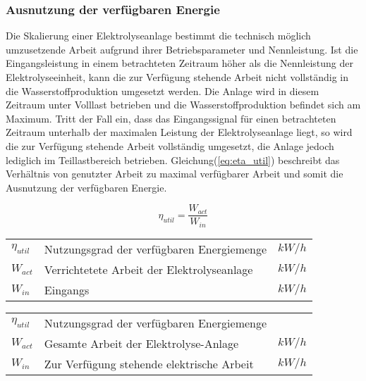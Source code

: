 \documentclass[onecolumn,10pt,titlepage]{article}
\begin{document}
			\subsubsection*{Ausnutzung der verfügbaren Energie}
			Die Skalierung einer Elektrolyseanlage bestimmt die technisch möglich umzusetzende Arbeit aufgrund ihrer Betriebsparameter und Nennleistung. Ist die Eingangsleistung in einem betrachteten Zeitraum höher als die Nennleistung der Elektrolyseeinheit, kann die zur Verfügung stehende Arbeit nicht vollständig in die Wasserstoffproduktion umgesetzt werden. Die Anlage wird in diesem Zeitraum unter Volllast betrieben und die Wasserstoffproduktion befindet sich am Maximum. Tritt der Fall ein, dass das Eingangssignal für einen betrachteten Zeitraum unterhalb der maximalen Leistung der Elektrolyseanlage liegt, so wird die zur Verfügung stehende Arbeit vollständig umgesetzt, die Anlage jedoch lediglich im Teillastbereich betrieben. Gleichung(\ref{eq:eta_util}) beschreibt das Verhältnis von genutzter Arbeit zu maximal verfügbarer Arbeit und somit die Ausnutzung der verfügbaren Energie.
			
			\begin{equation}
				\eta_{util}=\frac{W_{act}}{W_{in}}
				\label{eq:eta_util}
			\end{equation}
			
			\begin{table}[H]
				\begin{tabular*}{\textwidth}{lll}\\
					$\eta_{util}$&Nutzungsgrad der verfügbaren Energiemenge&$kW/h$\\
					$W_{act}$&Verrichtetete Arbeit der Elektrolyseanlage&$kW/h$\\
					$W_{in}$&Eingangs&$kW/h$\\
					
				\end{tabular*}
			\end{table}

			\begin{table}[H]
				\begin{tabular*}{\textwidth}{lll}\\
					$\eta_{util}$&Nutzungsgrad der verfügbaren Energiemenge&\\
					$W_{act}$&Gesamte Arbeit der Elektrolyse-Anlage&$kW/h$\\
					$W_{in}$&Zur Verfügung stehende elektrische Arbeit&$kW/h$\\
				\end{tabular*}
			\end{table}
		
\end{document}
